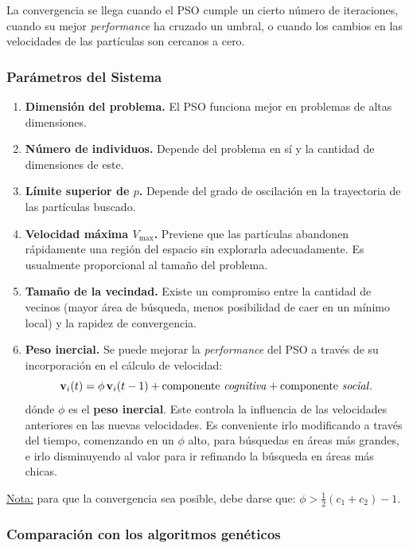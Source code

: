 \documentclass[10pt,a4paper]{article}
\begin{document}
La convergencia se llega cuando el PSO cumple un cierto número de iteraciones, cuando su mejor \textit{performance} ha cruzado un umbral, o cuando los cambios en las velocidades de las partículas son cercanos a cero.

\subsubsection{Parámetros del Sistema}

\begin{enumerate}
\item \textbf{Dimensión del problema.} El PSO funciona mejor en problemas de altas dimensiones.
\item \textbf{Número de individuos.} Depende del problema en sí y la cantidad de dimensiones de este.
\item \textbf{Límite superior de $p$.} Depende del grado de oscilación en la trayectoria de las partículas buscado.
\item \textbf{Velocidad máxima $V_{\max}$.} Previene que las partículas abandonen rápidamente una región del espacio sin explorarla adecuadamente. Es usualmente proporcional al tamaño del problema.
\item \textbf{Tamaño de la vecindad.} Existe un compromiso entre la cantidad de vecinos (mayor área de búsqueda, menos posibilidad de caer en un mínimo local) y la rapidez de convergencia.
\item \textbf{Peso inercial.} Se puede mejorar la \textit{performance} del PSO a través de su incorporación en el cálculo de velocidad:
\[
\mathbf{v}_{i}(t) = \phi \, \mathbf{v}_{i}(t-1) + \text{componente \textit{cognitiva}} + \text{componente \textit{social}}.
\]
dónde $\phi$ es el \textbf{peso inercial}. Este controla la influencia de las velocidades anteriores en las nuevas velocidades. Es conveniente irlo modificando a través del tiempo, comenzando en un $\phi$ alto, para búsquedas en áreas más grandes, e irlo disminuyendo al valor para ir refinando la búsqueda en áreas más chicas.
\end{enumerate}

\underline{Nota:} para que la convergencia sea posible, debe darse que: $\phi > \frac{1}{2} (c_1 + c_2) - 1$.

\subsubsection{Comparación con los algoritmos genéticos}
\end{document}
